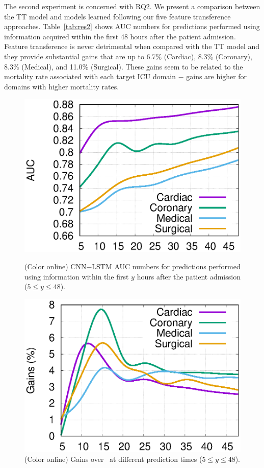 The second experiment is concerned with RQ2. We present a comparison between the TT model and models learned following our five feature transference approaches. Table~\ref{tab:res2} shows AUC numbers for predictions performed using information acquired within the first 48 hours after the patient admission. Feature transference is never detrimental when compared with the TT model and they provide substantial gains that are up to 6.7\% (Cardiac), 8.3\% (Coronary), 8.3\% (Medical), and 11.0\% (Surgical). These gains seem to be related to the mortality rate associated with each target ICU domain $-$ gains are higher for domains with higher mortality rates.

\begin{figure}[htb]
\begin{center}
\includegraphics[width=0.82\linewidth]{figs/auc_time3}
\end{center}
\caption{(Color online) CNN$-$LSTM AUC numbers for predictions performed using information within the first $y$ hours after the patient admission ($5\le y\le48$).}
\label{fig:time1}
\begin{center}
\includegraphics[width=0.82\linewidth]{figs/auc_time4}
\end{center}
\caption{(Color online) Gains over~\citep{kdd} at different prediction times ($5\le y\le48$).}
\label{fig:time2}
\end{figure}

